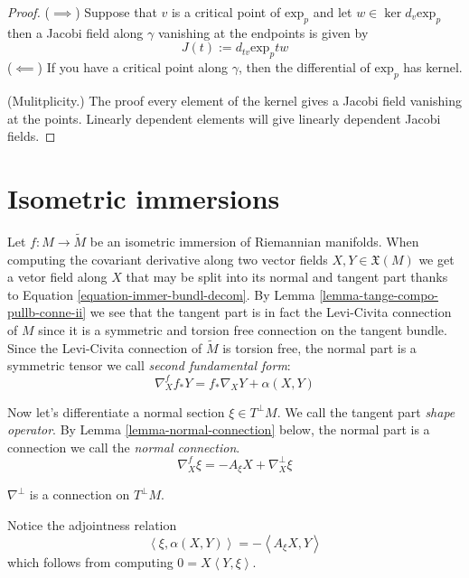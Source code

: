 \documentclass{book}
\begin{document}
\begin{proof}
($\implies$) Suppose that $v$ is a critical
point of $\text{exp}_p$ and
let $w \in \ker d_v \text{exp}_p$ then a
Jacobi field along $\gamma$
vanishing at the endpoints is given by
$$
J(t):=d_{tv}\text{exp}_ptw
$$
($\impliedby$) If you have a critical point
along $\gamma$, then the
differential of $\text{exp}_p$ has kernel.

(Mulitplicity.) The proof every element of
the kernel gives a Jacobi
 field vanishing at the points. Linearly
 dependent elements will give
 linearly dependent Jacobi fields.
\end{proof}

\section{Isometric immersions}
\label{section-isometric-immersions}

Let $f:M \to \tilde{M}$ be an isometric
immersion of Riemannian manifolds. When
computing the covariant derivative along two
vector fields
$X,Y \in\mathfrak{X}(M)$ we get a vetor field
along $X$ that may be split into
its normal and tangent part thanks to
Equation
\ref{equation-immer-bundl-decom}. By Lemma
\ref{lemma-tange-compo-pullb-conne-ii} we see
that the
 tangent part is
in fact the Levi-Civita connection of $M$
since it is a symmetric and torsion
free connection on the tangent bundle. Since
the Levi-Civita connection of
$\tilde{M}$ is torsion free, the normal part
is a
symmetric tensor we call {\it second
fundamental form}:
\begin{equation}
\label{equation-second-fundamental-form}
\nabla^{f}_X f_*Y=f_*\nabla_XY+\alpha(X,Y)
\end{equation}

\medskip\noindent

Now let's differentiate a normal section
$\xi\in T^\perp M$.
We call the tangent part {\it shape
operator}. By Lemma
\ref{lemma-normal-connection} below, the
normal part is a connection
we call the {\it normal connection}.
\begin{equation}
\label{equation-shape-operator}
\nabla^f_X\xi=-A_\xi X+\nabla^\perp_X\xi
\end{equation}
\begin{lemma}
\label{lemma-normal-connection}
$\nabla^\perp$ is a connection on $T^\perp
M$.
\end{lemma}
Notice the adjointness relation
\begin{equation}
\label{equation-secon-funda-form-shape}
\left\langle{}\xi,\alpha(X,Y)\right\rangle{}=-\left\langle{}A_\xi
X,Y\right\rangle{}
\end{equation}
which follows from computing
$0=X\left\langle{}Y,\xi\right\rangle{}$.
\end{document}
